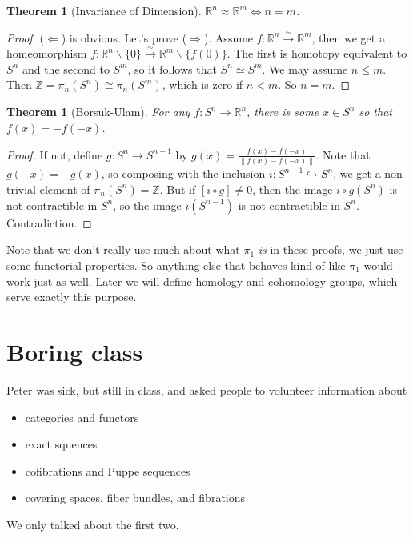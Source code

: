\documentclass[12pt]{article}
\theoremstyle{plain}
\newtheorem{theorem}[equation]{Theorem}
\theoremstyle{definition}
\theoremstyle{remark}
\newcommand{\RR}{\ensuremath{\mathbb{R}}}
\newcommand{\ZZ}{\ensuremath{\mathbb{Z}}}
\begin{document}
 \begin{theorem}[Invariance of Dimension]
   $\RR^n\approx \RR^m \Longleftrightarrow n=m$.
 \end{theorem}
 \begin{proof}
   ($\Leftarrow$) is obvious. Let's prove ($\Rightarrow$). Assume
   $f:\RR^n\xrightarrow{\sim} \RR^m$, then we get a homeomorphism $f:\RR^n\smallsetminus
   \{0\} \xrightarrow{\sim} \RR^m\smallsetminus\{f(0)\}$. The first is homotopy
   equivalent to $S^n$ and the second to $S^m$, so it follows that $S^n\simeq S^m$. We
   may assume $n\le m$. Then $\ZZ=\pi_n(S^n)\cong \pi_n(S^m)$, which is zero if $n<m$. So
   $n=m$.
 \end{proof}
 \begin{theorem}[Borsuk-Ulam]
   For any $f:S^n\to \RR^n$, there is some $x\in S^n$ so that $f(x)=-f(-x)$.
 \end{theorem}
 \begin{proof}
   If not, define $g:S^n\to S^{n-1}$ by $g(x) = \frac{f(x)-f(-x)}{\|f(x)-f(-x)\|}$. Note
   that $g(-x)=-g(x)$, so composing with the inclusion $i:S^{n-1}\hookrightarrow S^n$, we
   get a non-trivial element of $\pi_n(S^n)=\ZZ$. But if $[i\circ g]\neq 0$, then the
   image $i\circ g(S^n)$ is not contractible in $S^n$, so the image $i(S^{n-1})$ is not
   contractible in $S^n$. Contradiction.
 \end{proof}
 Note that we don't really use much about what $\pi_1$ \emph{is} in these proofs, we just
 use some functorial properties. So anything else that behaves kind of like $\pi_1$ would
 work just as well. Later we will define homology and cohomology groups, which serve
 exactly this purpose.

 \section{Boring class}
 Peter was sick, but still in class, and asked people to volunteer information about
 \begin{itemize}
   \item categories and functors
   \item exact squences
   \item cofibrations and Puppe sequences
   \item covering spaces, fiber bundles, and fibrations
 \end{itemize}
 We only talked about the first two.
\end{document}
